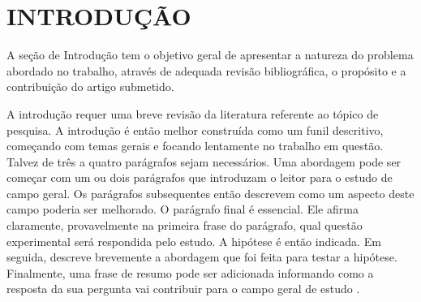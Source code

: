%


\section{INTRODUÇÃO}


A seção de Introdução tem o objetivo geral de apresentar a natureza do problema abordado no trabalho, através de adequada revisão bibliográfica, o propósito e a contribuição do artigo submetido.

A introdução requer uma breve revisão da literatura referente ao tópico de pesquisa. A introdução é então melhor construída como um funil descritivo, começando com temas gerais e focando lentamente no trabalho em questão. Talvez de três a quatro parágrafos sejam necessários. Uma abordagem pode ser começar com um ou dois parágrafos que introduzam o leitor para o estudo de campo geral. Os parágrafos subsequentes então descrevem como um aspecto deste campo poderia ser melhorado. O parágrafo final é essencial. Ele afirma claramente, provavelmente na primeira frase do parágrafo, qual questão experimental será respondida pelo estudo. A hipótese é então indicada. Em seguida, descreve brevemente a abordagem que foi feita para testar a hipótese. Finalmente, uma frase de resumo pode ser adicionada informando como a resposta da sua pergunta vai contribuir para o campo geral de estudo \cite{henrique_illa_font_projeto_2002}.


